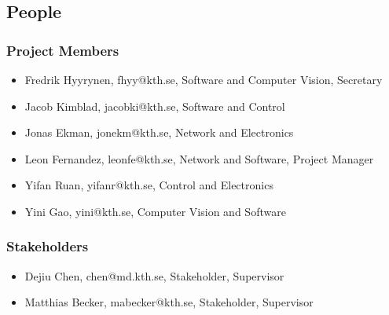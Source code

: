 \documentclass[11pt, titlepage]{article} %
\begin{document}
\subsection{People}

\subsubsection{Project Members}
\begin{itemize}
\item Fredrik Hyyrynen, fhyy@kth.se, Software and Computer Vision, Secretary
\item Jacob Kimblad, jacobki@kth.se, Software and Control
\item Jonas Ekman, jonekm@kth.se, Network and Electronics
\item Leon Fernandez, leonfe@kth.se, Network and Software, Project Manager
\item Yifan Ruan, yifanr@kth.se, Control and Electronics
\item Yini Gao, yini@kth.se, Computer Vision and Software
\end{itemize}

\subsubsection{Stakeholders}
\begin{itemize}
    \item Dejiu Chen, chen@md.kth.se, Stakeholder, Supervisor
    \item Matthias Becker, mabecker@kth.se, Stakeholder, Supervisor
\end{itemize}
\end{document}
